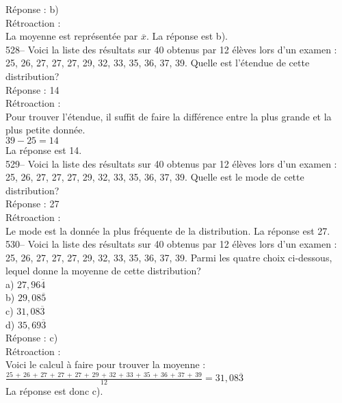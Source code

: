 ﻿\documentclass[letterpaper, 12pt]{article}
\begin{document}
R\'eponse : b)\\

R\'etroaction : \\
La moyenne est repr\'esent\'ee par $\overline{x}$.  La r\'eponse est b).\\

528-- Voici la liste des r\'esultats sur 40 obtenus par 12 \'el\`eves lors
d'un examen : 25, 26, 27, 27, 27, 29, 32, 33, 35, 36, 37, 39.  Quelle est
l'\'etendue de cette distribution?\\

R\'eponse : 14\\

R\'etroaction : \\
Pour trouver l'\'etendue, il suffit de faire la diff\'erence entre la plus
grande et la plus petite donn\'ee.  \\
$39-25=14$\\
La r\'eponse est 14.\\

529-- Voici la liste des r\'esultats sur 40 obtenus par 12 \'el\`eves lors
d'un examen : 25, 26, 27, 27, 27, 29, 32, 33, 35, 36, 37, 39.  Quelle est le
mode de cette distribution?\\

R\'eponse : 27\\

R\'etroaction : \\
Le mode est la donn\'ee la plus fr\'equente de la distribution.  La
r\'eponse est 27.\\

530-- Voici la liste des r\'esultats sur 40 obtenus par 12 \'el\`eves lors
d'un examen : 25, 26, 27, 27, 27, 29, 32, 33, 35, 36, 37, 39.  Parmi les
quatre choix ci-dessous, lequel donne la moyenne de cette distribution?\\
a) $27,96\overline{4}$\\
b) $29,08\overline{5}$\\
c) $31,08\overline{3}$\\
d) $35,69\overline{3}$\\

R\'eponse : c) \\

R\'etroaction : \\
Voici le calcul \`a faire pour trouver la moyenne :\\[2mm]
$\frac{25\,+\,26\,+\,27\,+\,27\,+\,27\,+\,29\,+\,32\,+\,33\,+\,35\,+\,36\,+\,37\,+\,39}{12}=31,08\overline{3}$\\[2mm]
La r\'eponse est donc c).\\
\end{document}
